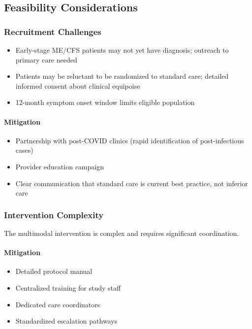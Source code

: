 \subsection{Feasibility Considerations}

\subsubsection{Recruitment Challenges}
\begin{itemize}
    \item Early-stage ME/CFS patients may not yet have diagnosis; outreach to primary care needed
    \item Patients may be reluctant to be randomized to standard care; detailed informed consent about clinical equipoise
    \item 12-month symptom onset window limits eligible population
\end{itemize}

\paragraph{Mitigation}
\begin{itemize}
    \item Partnership with post-COVID clinics (rapid identification of post-infectious cases)
    \item Provider education campaign
    \item Clear communication that standard care is current best practice, not inferior care
\end{itemize}

\subsubsection{Intervention Complexity}
The multimodal intervention is complex and requires significant coordination.

\paragraph{Mitigation}
\begin{itemize}
    \item Detailed protocol manual
    \item Centralized training for study staff
    \item Dedicated care coordinators
    \item Standardized escalation pathways
\end{itemize}

